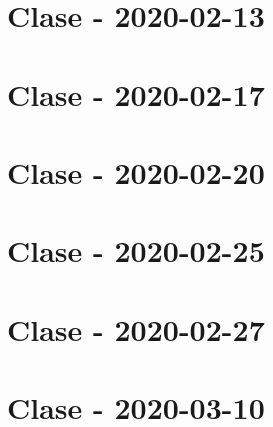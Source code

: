 \documentclass[openany]{book}
\begin{document}
\chapter{Clase - 2020-02-13}


\chapter{Clase - 2020-02-17}


\chapter{Clase - 2020-02-20}


\chapter{Clase - 2020-02-25}


\chapter{Clase - 2020-02-27}


\chapter{Clase - 2020-03-10}

\end{document}
